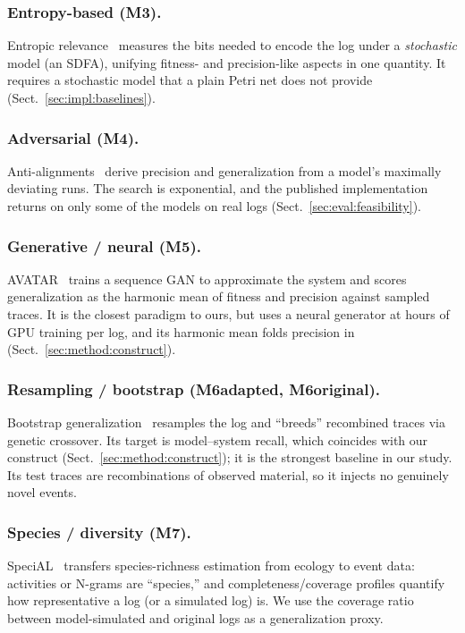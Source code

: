 \documentclass[runningheads]{llncs}
\newcommand{\chg}[1]{\textcolor{chgblue}{#1}}
\begin{document}
\subsubsection{Entropy-based (M3).}
Entropic relevance~\cite{alkhammash2022entropic} measures the bits needed to encode the log under a \emph{stochastic} model (an SDFA), unifying fitness- and precision-like aspects in one quantity. It requires a stochastic model that a plain Petri net does not provide (Sect.~\ref{sec:impl:baselines}).

\subsubsection{Adversarial (M4).}
\chg{Anti-alignments~\cite{vandongen2016anti} derive precision and generalization from a model's maximally deviating runs.} The search is exponential, and the published implementation returns on only some of the models on real logs (Sect.~\ref{sec:eval:feasibility}).

\subsubsection{Generative / neural (M5).}
AVATAR~\cite{theis2020avatar} trains a sequence GAN to approximate the system and scores generalization as the harmonic mean of fitness and precision against sampled traces. It is the closest paradigm to ours, but uses a neural generator at hours of GPU training per log, and its harmonic mean folds precision in (Sect.~\ref{sec:method:construct}).

\subsubsection{Resampling / bootstrap (M6adapted, M6original).}
Bootstrap generalization~\cite{polyvyanyy2022bootstrap} resamples the log and ``breeds'' recombined traces via genetic crossover. Its target is model--system recall, which coincides with our construct (Sect.~\ref{sec:method:construct}); it is the strongest baseline in our study. Its test traces are recombinations of observed material, so it injects no genuinely novel events.

\subsubsection{Species / diversity (M7).}
SpeciAL~\cite{kabierski2023species} transfers species-richness estimation from ecology to event data: activities or N-grams are ``species,'' and completeness/coverage profiles quantify how representative a log (or a simulated log) is. We use the coverage ratio between model-simulated and original logs as a generalization proxy.
\end{document}
